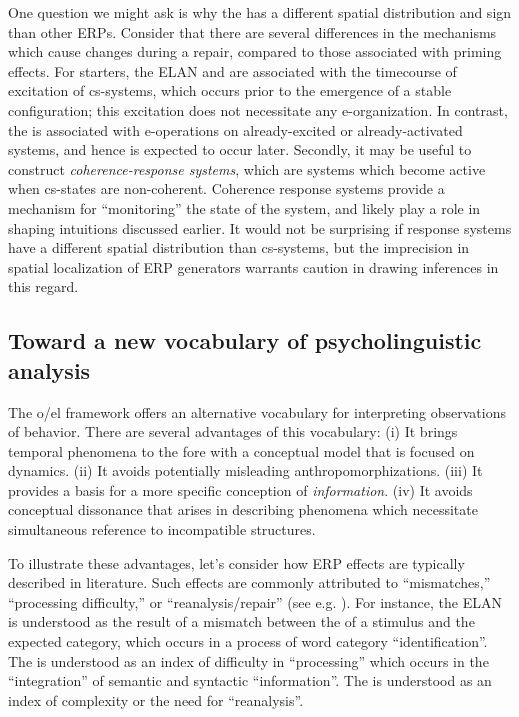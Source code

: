 One question we might ask is why the  has a different spatial distribution and sign than other ERPs. Consider that there are several differences in the mechanisms which cause  changes during a repair, compared to those associated with priming effects. For starters, the ELAN and  are associated with the timecourse of excitation of cs-sys\-tems, which occurs prior to the emergence of a stable configuration; this excitation does not necessitate any e-or\-ga\-ni\-za\-tion. In contrast, the  is associated with e-operations on already-excited or already-activated systems, and hence is expected to occur later. Secondly, it may be useful to construct \textit{coherence-response systems}, which are systems which become active when cs-states are non-coherent. Coherence response systems provide a mechanism for “monitoring” the state of the system, and likely play a role in shaping  intuitions discussed earlier. It would not be surprising if  response systems have a different spatial distribution than cs-sys\-tems, but the imprecision in spatial localization of ERP generators warrants caution in drawing inferences in this regard.

\subsection{Toward a new vocabulary of psycholinguistic analysis}

The o/el framework offers an alternative vocabulary for interpreting  observations of behavior. There are several advantages of this vocabulary: (i) It brings temporal phenomena to the fore with a conceptual model that is focused on dynamics. (ii) It avoids potentially misleading anthropomorphizations. (iii) It provides a basis for a more specific conception of \textit{information}. (iv) It avoids conceptual dissonance that arises in describing phenomena which necessitate simultaneous reference to incompatible structures.

To illustrate these advantages, let's consider how ERP effects are typically described in  literature. Such effects are commonly attributed to “mismatches,” “processing difficulty,” or “reanalysis/repair” (see e.g. \citealt{Friederici2002,KutasFedermeier2011}). For instance, the ELAN is understood as the result of a mismatch between the  of a stimulus and the expected category, which occurs in a process of word category “identification”. The  is understood as an index of difficulty in “processing” which occurs in the “integration” of semantic and syntactic “information”. The  is understood as an index of complexity or the need for “reanalysis”.

